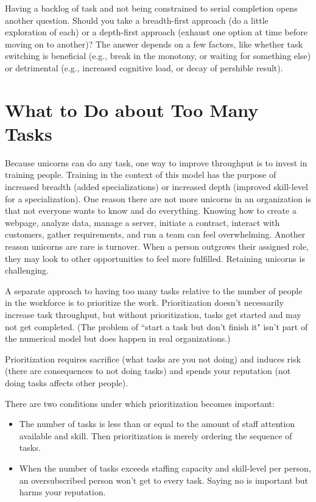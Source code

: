 Having a backlog of task and not being constrained to serial completion opens another question. Should you take a breadth-first approach (do a little exploration of each) or a depth-first approach (exhaust one option at time before moving on to another)? The answer depends on a few factors, like whether task switching is beneficial (e.g., break in the monotony, or waiting for something else) or detrimental (e.g., increased cognitive load, or decay of pershible result). 

\section*{What to Do about Too Many Tasks}


Because unicorns can do any task, one way to improve throughput is to invest in training people. Training in the context of this model has the purpose of  increased breadth (added specializations) or increased depth (improved skill-level for a specialization). One reason there are not more unicorns in an organization is that not everyone wants to know and do everything. Knowing how to create a webpage, analyze data, manage a server, initiate a contract, interact with customers, gather requirements, and run a team can feel overwhelming. Another reason unicorns are rare is turnover. When a person outgrows their assigned role,  they may look to other opportunities to feel more fulfilled. Retaining unicorns is challenging.

A separate approach to having too many tasks relative to the number of people in the workforce is to prioritize the work. Prioritization doesn't necessarily increase task throughput, but without prioritization, tasks get started and may not get completed. (The problem of ``start a task but don't finish it" isn't part of the numerical model but does happen in real organizations.)

Prioritization requires sacrifice (what tasks are you not doing) and induces risk (there are consequences to not doing tasks) and spends your reputation (not doing tasks affects other people).

There are two conditions under which prioritization becomes important:
\begin{itemize}
    \item The number of tasks is less than or equal to the amount of staff attention available and skill. Then prioritization is merely ordering the sequence of tasks.
    \item When the number of tasks exceeds staffing capacity and skill-level per person, an oversubscribed person won't get to every task. Saying no is important but harms your reputation.
\end{itemize}


